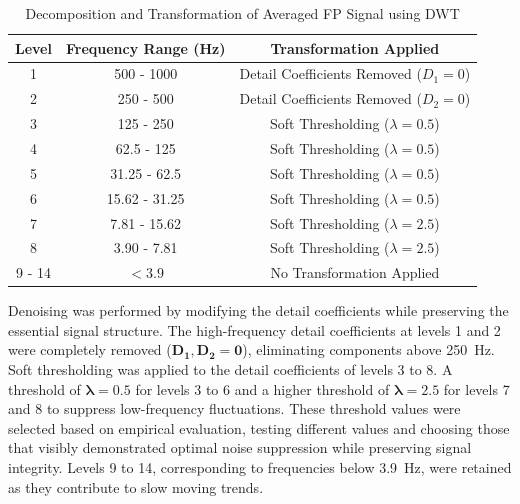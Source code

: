 \documentclass{report}
\begin{document}
            \begin{table}[H]
                \centering
                \caption{Decomposition and Transformation of Averaged FP Signal using DWT}
                \label{tab:fp_dwt_decomposition}
                \begin{tabular}{c c c}
                    \toprule
                    \textbf{Level} & \textbf{Frequency Range (Hz)} & \textbf{Transformation Applied} \\
                    \midrule
                    1 & 500 - 1000  & Detail Coefficients Removed (\(D_1 = 0\)) \\
                    2 & 250 - 500   & Detail Coefficients Removed (\(D_2 = 0\)) \\
                    3 & 125 - 250   & Soft Thresholding (\(\lambda = 0.5\)) \\
                    4 & 62.5 - 125  & Soft Thresholding (\(\lambda = 0.5\)) \\
                    5 & 31.25 - 62.5 & Soft Thresholding (\(\lambda = 0.5\)) \\
                    6 & 15.62 - 31.25 & Soft Thresholding (\(\lambda = 0.5\)) \\
                    7 & 7.81 - 15.62 & Soft Thresholding (\(\lambda = 2.5\)) \\
                    8 & 3.90 - 7.81 & Soft Thresholding (\(\lambda = 2.5\)) \\
                    9 - 14 & \( < 3.9 \) & No Transformation Applied \\
                    \bottomrule
                \end{tabular}
            \end{table}
            
            Denoising was performed by modifying the detail coefficients while preserving the essential signal structure. The high-frequency detail coefficients at levels 1 and 2 were completely removed (\(\bm{D_1, D_2 = 0}\)), eliminating components above \SI{250}{\hertz}. Soft thresholding was applied to the detail coefficients of levels 3 to 8. A threshold of \(\bm{\lambda = 0.5}\) for levels 3 to 6 and a higher threshold of \(\bm{\lambda = 2.5}\) for levels 7 and 8 to suppress low-frequency fluctuations.  These threshold values were selected based on empirical evaluation, testing different values and choosing those that visibly demonstrated optimal noise suppression while preserving signal integrity. Levels 9 to 14, corresponding to frequencies below  \SI{3.9}{\hertz}, were retained as they contribute to slow moving trends. 
            
\end{document}
